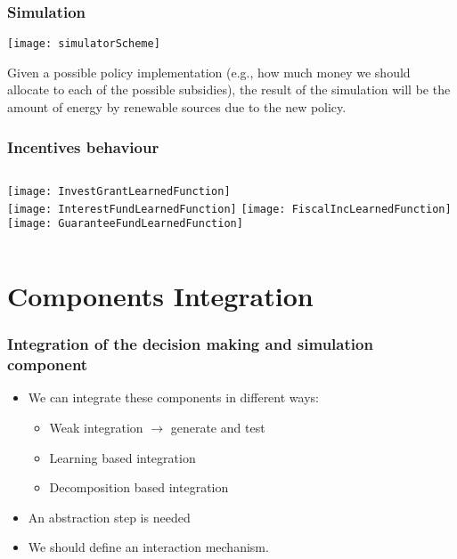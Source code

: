 \documentclass{beamer}
\begin{document}
	\begin{frame}
	\frametitle{Simulation}
			\centering
			\texttt{[image: simulatorScheme]}
			\begin{block}{}
				Given a possible policy implementation (e.g., how much money we should allocate to each of the possible subsidies), the result of the simulation will be the amount of energy by renewable sources due to the new policy.
			\end{block}
	\end{frame}
	
	\begin{frame}
	\frametitle{Incentives behaviour}
		\begin{columns}[t]
			\column{.5\textwidth}
			\centering
			\texttt{[image: InvestGrantLearnedFunction]}\\		
			\texttt{[image: InterestFundLearnedFunction]}
			\column{.5\textwidth}
			\centering
			\texttt{[image: FiscalIncLearnedFunction]}\\
			\texttt{[image: GuaranteeFundLearnedFunction]}
		\end{columns}
	\end{frame}
	
\section{Components Integration}

	\begin{frame}
	\frametitle{Integration of the decision making and simulation component}
		\begin{itemize}
			\item We can integrate these components in different ways:
			\begin{itemize}
				\item<1-> Weak integration $ \rightarrow $ generate and test
				\item<1-| alert@2> Learning based integration
				\item<1-> Decomposition based integration 
			\end{itemize}
			\item An abstraction step is needed
			\item We should define an interaction mechanism.
		\end{itemize}
	\end{frame}
	
\end{document}
